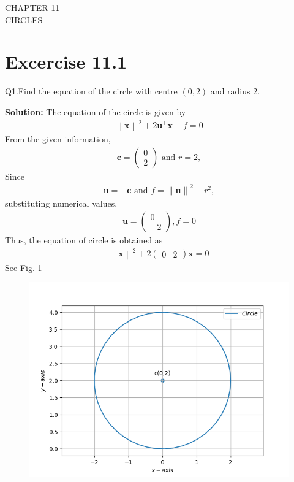 \documentclass[12pt]{article}
\providecommand{\norm}[1]{\left\lVert#1\right\rVert}
\newcommand{\solution}{\noindent \textbf{Solution: }}
\newcommand{\myvec}[1]{\ensuremath{\begin{pmatrix}#1\end{pmatrix}}}
\let\vec\mathbf
\begin{document}
\begin{center}
\textbf\large{CHAPTER-11 \\ CIRCLES}

\end{center}
\section*{Excercise 11.1}

Q1.Find the equation of the circle with centre $(0,2)$ and radius 2.

\solution
\fi
The equation of the circle is given by 
\begin{align}
	\norm{\vec{x}}^{2} + 2\vec{u}^{\top}\vec{x} + f = 0
\end{align}
From the given information,
\begin{align}
	\vec{c} = \myvec{0\\2} \text{ and } r = 2,
\end{align}
Since 
\begin{align}
	\vec{u} = -\vec{c} \text{ and } f = \norm{\vec{u}}^{2} - r^{2},
\end{align}
substituting numerical values, 
\begin{align}
	\vec{u} = \myvec{0\\-2},
	f 
	  = 0
\end{align}
Thus, the equation of circle is obtained as
\begin{align}
	\norm{\vec{x}}^2 + 2\myvec{0 & 2}\vec{x} = 0
\end{align}
See Fig. \ref{fig:11/11/1/1/Fig1}	
\begin{figure}[!h]
	\begin{center} 
	    \includegraphics[width=\columnwidth]{chapters/11/11/1/1/figs/circ1}
	\end{center}
\caption{}
\label{fig:11/11/1/1/Fig1}
\end{figure}
\end{document}
